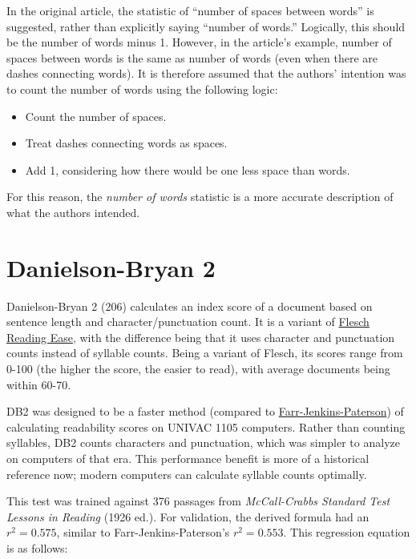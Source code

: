 \documentclass[
]{book}
\providecommand{\tightlist}{%
  \setlength{\itemsep}{0pt}\setlength{\parskip}{0pt}}
\theoremstyle{definition}
\theoremstyle{definition}
\theoremstyle{definition}
\theoremstyle{definition}
\theoremstyle{remark}
\begin{document}
In the original article, the statistic of ``number of spaces between words'' is suggested, rather than explicitly saying ``number of words.'' Logically, this should be the number of words minus 1. However, in the article's example, number of spaces between words is the same as number of words (even when there are dashes connecting words). It is therefore assumed that the authors' intention was to count the number of words using the following logic:

\begin{itemize}
\tightlist
\item
  Count the number of spaces.
\item
  Treat dashes connecting words as spaces.
\item
  Add 1, considering how there would be one less space than words.
\end{itemize}

For this reason, the \emph{number of words} statistic is a more accurate description of what the authors intended.

\newpage

\hypertarget{danielson-bryan-2}{%
\section{\texorpdfstring{Danielson-Bryan 2}{Danielson-Bryan 2}}\label{danielson-bryan-2}}

Danielson-Bryan 2 (206) calculates an index score of a document based on sentence length and character/punctuation count. It is a variant of \protect\hyperlink{flesch-test}{Flesch Reading Ease}, with the difference being that it uses character and punctuation counts instead of syllable counts. Being a variant of Flesch, its scores range from 0-100 (the higher the score, the easier to read), with average documents being within 60-70.

DB2 was designed to be a faster method (compared to \protect\hyperlink{farr-jenkins-paterson}{Farr-Jenkins-Paterson}) of calculating readability scores on UNIVAC 1105 computers. Rather than counting syllables, DB2 counts characters and punctuation, which was simpler to analyze on computers of that era. This performance benefit is more of a historical reference now; modern computers can calculate syllable counts optimally.

This test was trained against 376 passages from \emph{McCall-Crabbs Standard Test Lessons in Reading} (1926 ed.). For validation, the derived formula had an \(r^2 = 0.575\), similar to Farr-Jenkins-Paterson's \(r^2 = 0.553\). This regression equation is as follows:
\end{document}
